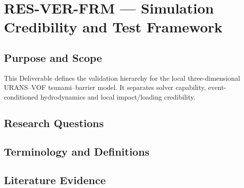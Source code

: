 
\section{RES-VER-FRM --- Simulation Credibility and Test Framework}
\label{sec:res-ver-frm}

\subsection{Purpose and Scope}
\label{sec:res-ver-frm-purpose}


This Deliverable defines the validation hierarchy for the local
three-dimensional URANS--VOF tsunami--barrier model. It separates
solver capability, event-conditioned hydrodynamics and local
impact/loading credibility.

\subsection{Research Questions}
\label{sec:res-ver-frm-research-questions}


\subsection{Terminology and Definitions}
\label{sec:res-ver-frm-definitions}


\subsection{Literature Evidence}
\label{sec:res-ver-frm-literature-evidence}

%

